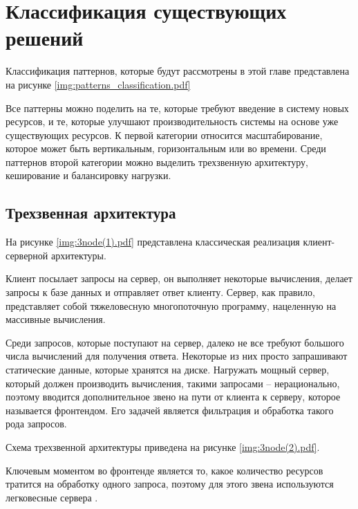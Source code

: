 \chapter{Классификация существующих решений}

Классификация паттернов, которые будут рассмотрены в этой главе представлена на рисунке \ref{img:patterns_classification.pdf}


Все паттерны можно поделить на те, которые требуют введение в систему новых ресурсов, и те, которые улучшают производительность системы на основе уже существующих ресурсов. К первой категории относится масштабирование, которое может быть вертикальным, горизонтальным или во времени. Среди паттернов второй категории можно выделить трехзвенную архитектуру, кеширование и балансировку нагрузки.

\section{Трехзвенная архитектура}

На рисунке \ref{img:3node(1).pdf} представлена классическая реализация клиент-серверной архитектуры.


Клиент посылает запросы на сервер, он выполняет некоторые вычисления, делает запросы к базе данных и отправляет ответ клиенту.
Сервер, как правило, представляет собой тяжеловесную многопоточную программу, нацеленную на массивные вычисления.

Среди запросов, которые поступают на сервер, далеко не все требуют большого числа вычислений для получения ответа. Некоторые из них просто запрашивают статические данные, которые хранятся на диске. Нагружать мощный сервер, который должен производить вычисления, такими запросами -- нерационально, поэтому вводится дополнительное звено на пути от клиента к серверу, которое называется фронтендом. Его задачей является фильтрация и обработка такого рода запросов.

Схема трехзвенной архитектуры приведена на рисунке \ref{img:3node(2).pdf}.


Ключевым моментом во
фронтенде является то, какое количество ресурсов
тратится на обработку одного запроса, поэтому для
этого звена используются легковесные сервера \cite{cyberlenin1}.


